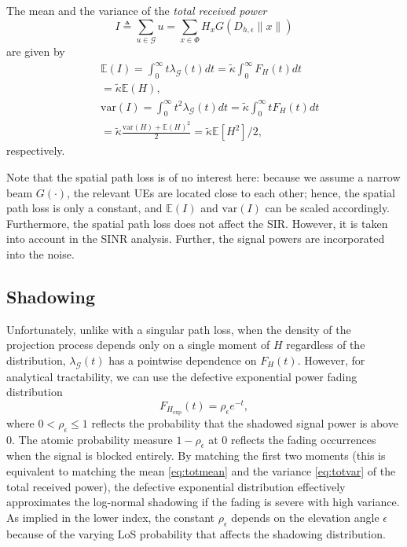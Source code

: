 \documentclass[lettersize,journal]{IEEEtran}
\begin{document}
The mean and the variance of the \textit{total received power}
\begin{equation}
  \label{eq:totpow}
  I \triangleq \sum\limits_{u \in \mathcal{G}} u = \sum\limits_{x \in \Phi} H_x G(D_{h,\epsilon}\|x\|)
\end{equation}
  are given by
\begin{align}
  \label{eq:totmean}
  &\mathbb{E}\left(I \right) = \int_{0}^{\infty} t\lambda_{\mathcal{G}}(t) dt = \tilde{\kappa} \int_{0}^{\infty}F_H(t) dt \nonumber \\
  &=\tilde{\kappa} \mathbb{E}(H), \\\
  \label{eq:totvar}
  &\text{var}\left(I \right) = \int_{0}^{\infty} t^2\lambda_{\mathcal{G}}(t) dt= \tilde{\kappa} \int_0^{\infty}tF_H(t) dt  \nonumber \\
  &= \tilde{\kappa} \frac{\text{var}(H) + \mathbb{E}(H)^2}{2} = \tilde{\kappa}  \mathbb{E}[H^2]/2,
\end{align}
respectively.

Note that the spatial path loss is of no interest here: because we assume a narrow beam $G(\cdot)$, the relevant UEs are located close to each other; hence, the spatial path loss is only a constant, and $\mathbb{E}(I)$ and $\text{var}(I)$ can be scaled accordingly. Furthermore, the spatial path loss does not affect the SIR. However, it is taken into account in the SINR analysis. Further, the signal powers are incorporated into the noise.




\subsection{Shadowing}
Unfortunately, unlike with a singular path loss, when the density of the projection process depends only on a single moment of $H$ regardless of the distribution, $\lambda_{\mathcal{G}}(t)$ has a pointwise dependence on $F_H(t)$. However, for analytical tractability, we can use the defective exponential power fading distribution
\begin{equation}
  \label{eq:defexp}
  F_{{H}_{\text{exp}}}(t)=\rho_{\epsilon} e^{- t},
\end{equation}
where $0<\rho_{\epsilon} \leq 1$ reflects the probability that the shadowed signal power is above $0$. The atomic probability measure $1-\rho_{\epsilon}$ at $0$ reflects the fading occurrences when the signal is blocked entirely. By matching the first two moments (this is equivalent to matching the mean \eqref{eq:totmean} and the variance \eqref{eq:totvar} of the total received power), the defective exponential distribution effectively approximates the log-normal shadowing if the fading is severe with high variance. As implied in the lower index, the constant $\rho_{\epsilon}$ depends on the elevation angle $\epsilon$ because of the varying LoS probability that affects the shadowing distribution.
\end{document}
